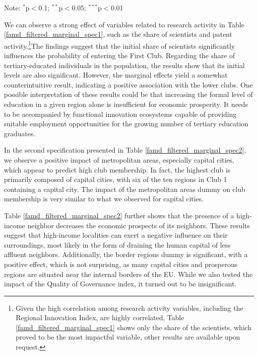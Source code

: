 \documentclass[11pt]{article}
\begin{document}
\begin{table}[!htbp]
{\begin{minipage}{\textwidth}
\begin{tablenotes}
\small 
\item Note: $^{*}$p$<$0.1; $^{**}$p$<$0.05; $^{***}$p$<$0.01
\end{tablenotes}
\end{minipage}}
\end{table} 

We can observe a strong effect of variables related to research activity in Table \ref{famd_filtered_marginal_spec1}, such as the share of scientists and patent activity.\footnote{Given the high correlation among research activity variables, including the Regional Innovation Index, are highly correlated, Table \ref{famd_filtered_marginal_spec1} shows only the share of the scientists, which proved to be the most impactful variable, other results are available upon request.}The findings suggest that the initial share of scientists significantly influences the probability of entering the First Club. Regarding the share of tertiary-educated individuals in the population, the results show that its initial levels are also significant. However, the marginal effects yield a somewhat counterintuitive result, indicating a positive association with the lower clubs. One possible interpretation of these results could be that increasing the formal level of education in a given region alone is insufficient for economic prosperity. It needs to be accompanied by functional innovation ecosystems capable of providing suitable employment opportunities for the growing number of tertiary education graduates.

In the second specification presented in Table \ref{famd_filtered_marginal_spec2}, we observe a positive impact of metropolitan areas, especially capital cities, which appear to predict high club membership. In fact, the highest club is primarily composed of capital cities, with six of the ten regions in Club 1 containing a capital city. The impact of the metropolitan areas dummy on club membership is very similar to what we observed for capital cities.

Table \ref{famd_filtered_marginal_spec2} further shows that the presence of a high-income neighbor decreases the economic prospects of its neighbors. These results suggest that high-income localities can exert a negative influence on their surroundings, most likely in the form of draining the human capital of less affluent neighbors. Additionally, the border regions dummy is significant, with a positive effect, which is not surprising, as many capital cities and prosperous regions are situated near the internal borders of the EU. While we also tested the impact of the Quality of Governance index, it turned out to be insignificant.
\end{document}
